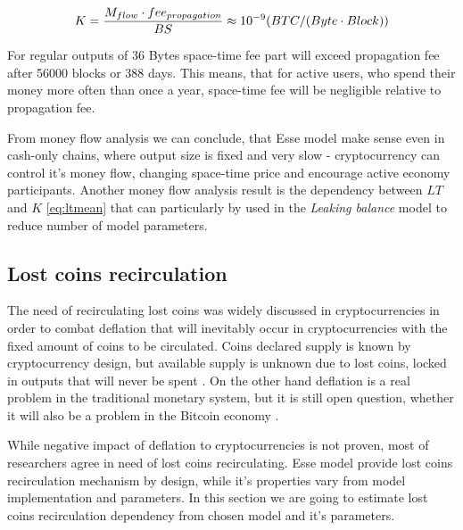 \documentclass[]{article}   %
\newcommand{\esse}{Esse}
\begin{document}
\begin{equation}
K={M_{flow} \cdot fee_{propagation} \over BS} \approx {10^{-9}}{(BTC / (Byte \cdot Block))}
\end{equation}

For regular outputs of 36 Bytes space-time fee part will exceed propagation fee after 56000 blocks or 388 days. This means, that for active users, who spend their money more often than once a year, space-time fee will be negligible relative to propagation fee.

From money flow analysis we can conclude, that \esse{} model make sense even in cash-only chains, where output size is fixed and very slow - cryptocurrency can control it's money flow, changing space-time price and encourage active economy participants. Another money flow analysis result is the dependency between $LT$ and $K$ \ref{eq:ltmean}
 that can particularly by used in the \textit{Leaking balance} model to reduce number of model parameters.


\subsection{Lost coins recirculation}
\label{sec:re}

The need of recirculating lost coins was widely discussed in cryptocurrencies \cite{gjermundrod2014recirculating, gjermundrod2016going} in order to combat deflation that will inevitably occur in cryptocurrencies with the fixed amount of coins to be circulated. Coins declared supply is known by cryptocurrency design, but available supply is unknown due to lost coins, locked in outputs that will never be spent \cite{ron2013quantitative}. On the other hand deflation is a real problem in the traditional monetary system, but it is still open question, whether it will also be a problem in the Bitcoin economy \cite{bitcoinDeflationarySpiral, barber2012bitter}.

While negative impact of deflation to cryptocurrencies is not proven, most of researchers agree in need of lost coins recirculating. \esse{} model provide lost coins recirculation mechanism by design, while it's properties vary from model implementation and parameters. In this section we are going to estimate lost coins recirculation dependency from chosen model and it's parameters.
\end{document}
